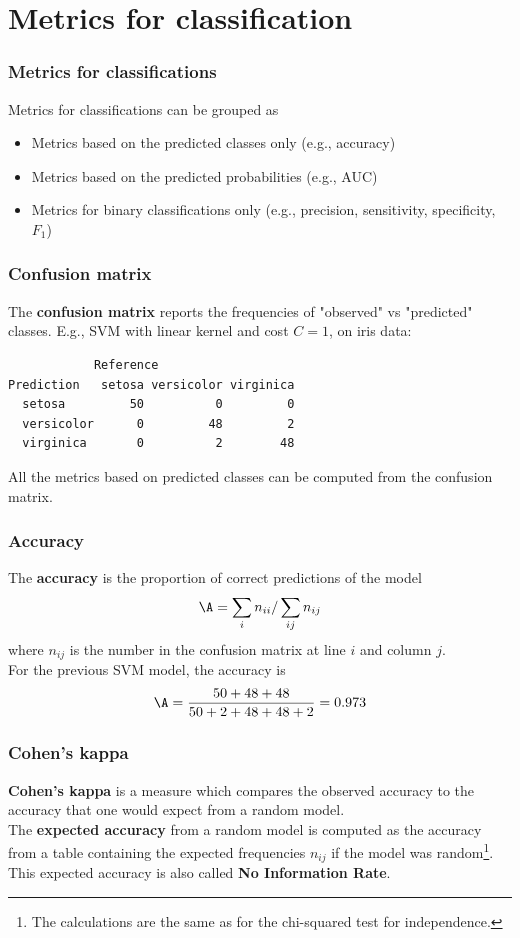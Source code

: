 \section{Metrics for classification}
\begin{frame}
\frametitle{Metrics for classifications}
Metrics for classifications can be grouped as
\begin{itemize}
\item Metrics based on the predicted classes only (e.g., accuracy)
\item Metrics based on the predicted probabilities (e.g., AUC)
\item Metrics for binary classifications only (e.g., precision, sensitivity, specificity, $F_1$)
\end{itemize}
\end{frame}
\begin{frame}[fragile]
\frametitle{Confusion matrix}
The {\bf confusion matrix} reports the frequencies of "observed" vs "predicted" classes. E.g., SVM with linear kernel and cost $C=1$, on iris data:\\
\scriptsize
\begin{verbatim}
            Reference
Prediction   setosa versicolor virginica
  setosa         50          0         0
  versicolor      0         48         2
  virginica       0          2        48
\end{verbatim}
\normalsize
All the metrics based on predicted classes can be computed from the confusion matrix.
\end{frame}
\begin{frame}
\frametitle{Accuracy}
The {\bf accuracy} is the proportion of correct predictions of the model
$$
\A = \sum_i n_{ii}/\sum_{ij} n_{ij}
$$
where $n_{ij}$ is the number in the confusion matrix at line $i$ and column $j$.\\
\vspace{0.3cm}
For the previous SVM model, the accuracy is
$$
\A = \frac{50+48+48}{50+2+48+48+2} = 0.973
$$
\end{frame}
\begin{frame}
\frametitle{Cohen's kappa}
{\bf Cohen's kappa} is a measure which compares the observed accuracy to the accuracy that one would expect from a random model.\\
\vspace{0.2cm}
The {\bf expected accuracy} from a random model is computed as the accuracy from a table containing the expected frequencies $n_{ij}$ if the model was random\footnote{The calculations are the same as for the chi-squared test for independence.}.\\
\vspace{0.3cm}
This expected accuracy is also called {\bf No Information Rate}.
\end{frame}
